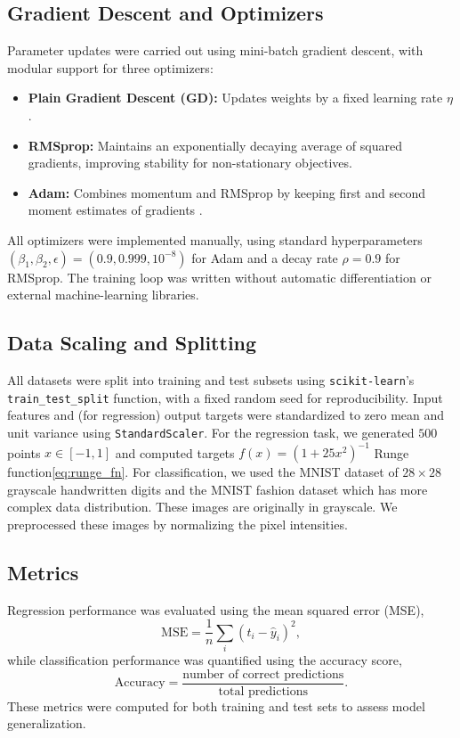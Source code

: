 \documentclass[amssymb,twocolumn,aps]{revtex4}
\begin{document}
\subsection{Gradient Descent and Optimizers}
Parameter updates were carried out using mini-batch gradient descent, with modular support for three optimizers:
\begin{itemize}
    \item \textbf{Plain Gradient Descent (GD):} Updates weights by a fixed learning rate $\eta$.
    \item \textbf{RMSprop:} Maintains an exponentially decaying average of squared gradients, improving stability for non-stationary objectives.
  \item \textbf{Adam:} Combines momentum and RMSprop by keeping first and second moment estimates of gradients \cite{kingma2014adam}.
\end{itemize}
All optimizers were implemented manually, using standard hyperparameters $(\beta_1, \beta_2, \epsilon) = (0.9, 0.999, 10^{-8})$ for Adam and a decay rate $\rho = 0.9$ for RMSprop. The training loop was written without automatic differentiation or external machine-learning libraries.

\subsection{Data Scaling and Splitting}
All datasets were split into training and test subsets using \texttt{scikit-learn}'s\cite{scikit-learn} \texttt{train\_test\_split} function, with a fixed random seed for reproducibility. Input features and (for regression) output targets were standardized to zero mean and unit variance using \texttt{StandardScaler}. For the regression task, we generated $500$ points $x \in [-1, 1]$ and computed targets $f(x) = (1 + 25x^2)^{-1}$ Runge function\ref{eq:runge_fn}. For classification, we used the MNIST dataset of $28 \times 28$ grayscale handwritten digits and the MNIST fashion dataset which has more complex data distribution. These images are originally in grayscale. We preprocessed these images by normalizing the pixel intensities.

\subsection{Metrics}
Regression performance was evaluated using the mean squared error (MSE),
\[
\mathrm{MSE} = \frac{1}{n}\sum_i (t_i - \hat{y}_i)^2,
\]
while classification performance was quantified using the accuracy score,
\[
\mathrm{Accuracy} = \frac{\text{number of correct predictions}}{\text{total predictions}}.
\]
These metrics were computed for both training and test sets to assess model generalization.
\end{document}
